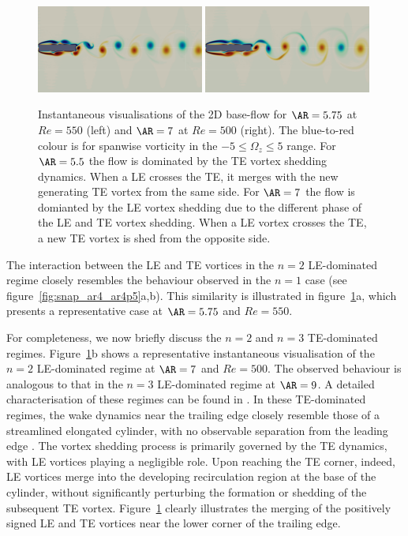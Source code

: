 \begin{figure}
  \centering
  \includegraphics[width=0.49\textwidth]{./fig/AR5p75/vort_bf_Re550_100.png}
  \includegraphics[width=0.49\textwidth]{./fig/AR7s/vort_bf_Re500_100.png}
  \caption{Instantaneous visualisations of the 2D base-flow for $\AR=5.75$ at $Re=550$ (left) and $\AR=7$ at $Re=500$ (right). The blue-to-red colour is for spanwise vorticity in the $-5 \le \Omega_z \le 5$ range. For $\AR=5.5$ the flow is dominated by the TE vortex shedding dynamics. When a LE crosses the TE, it merges with the new generating TE vortex from the same side. For $\AR=7$ the flow is domianted by the LE vortex shedding due to the different phase of the LE and TE vortex shedding. When a LE vortex crosses the TE, a new TE vortex is shed from the opposite side.}
  \label{fig:bf_elongated}
\end{figure}

The interaction between the LE and TE vortices in the $n=2$ LE-dominated regime closely resembles the behaviour observed in the $n=1$ case (see figure~\ref{fig:snap_ar4_ar4p5}a,b). This similarity is illustrated in figure~\ref{fig:bf_elongated}a, which presents a representative case at $\AR = 5.75$ and $Re = 550$.

For completeness, we now briefly discuss the $n=2$ and $n=3$ TE-dominated regimes. Figure~\ref{fig:bf_elongated}b shows a representative instantaneous visualisation of the $n=2$ LE-dominated regime at $\AR = 7$ and $Re = 500$. The observed behaviour is analogous to that in the $n=3$ LE-dominated regime at $\AR = 9$. A detailed characterisation of these regimes can be found in \citet{chiarini-quadrio-auteri-2022}.
%
In these TE-dominated regimes, the wake dynamics near the trailing edge closely resemble those of a streamlined elongated cylinder, with no observable separation from the leading edge \citep{chiarini-quadrio-auteri-2022}. The vortex shedding process is primarily governed by the TE dynamics, with LE vortices playing a negligible role. Upon reaching the TE corner, indeed, LE vortices merge into the developing recirculation region at the base of the cylinder, without significantly perturbing the formation or shedding of the subsequent TE vortex. Figure~\ref{fig:bf_elongated} clearly illustrates the merging of the positively signed LE and TE vortices near the lower corner of the trailing edge.

